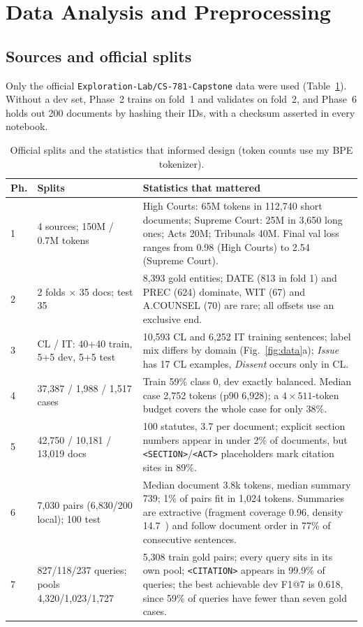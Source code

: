 \documentclass[11pt, oneside]{article}
\begin{document}
\section{Data Analysis and Preprocessing}
\subsection{Sources and official splits}
Only the official \texttt{Exploration-Lab/CS-781-Capstone} data were used (Table~\ref{tab:data}). Without a dev set, Phase~2 trains on fold~1 and validates on fold~2, and Phase~6 holds out 200 documents by hashing their IDs, with a checksum asserted in every notebook.

\begin{table}[t]
\centering
\footnotesize
\caption{Official splits and the statistics that informed design (token counts use my BPE tokenizer).}
\label{tab:data}
\begin{tabular}{p{0.5cm}p{3.6cm}p{10.3cm}}
\toprule
Ph. & Splits & Statistics that mattered \\
\midrule
1 & 4 sources; 150M / 0.7M tokens & High Courts: 65M tokens in 112,740 short documents; Supreme Court: 25M in 3,650 long ones; Acts 20M; Tribunals 40M. Final val loss ranges from 0.98 (High Courts) to 2.54 (Supreme Court). \\
2 & 2 folds $\times$ 35 docs; test 35 & 8,393 gold entities; DATE (813 in fold 1) and PREC (624) dominate, WIT (67) and A.COUNSEL (70) are rare; all offsets use an exclusive end. \\
3 & CL / IT: 40+40 train, 5+5 dev, 5+5 test & 10,593 CL and 6,252 IT training sentences; label mix differs by domain (Fig.~\ref{fig:data}a); \emph{Issue} has 17 CL examples, \emph{Dissent} occurs only in CL. \\
4 & 37,387 / 1,988 / 1,517 cases & Train 59\% class 0, dev exactly balanced. Median case 2,752 tokens (p90 6,928); a $4\times511$-token budget covers the whole case for only 38\%. \\
5 & 42,750 / 10,181 / 13,019 docs & 100 statutes, 3.7 per document; explicit section numbers appear in under 2\% of documents, but \texttt{<SECTION>}/\texttt{<ACT>} placeholders mark citation sites in 89\%. \\
6 & 7,030 pairs (6,830/200 local); 100 test & Median document 3.8k tokens, median summary 739; 1\% of pairs fit in 1,024 tokens. Summaries are extractive (fragment coverage 0.96, density 14.7~\cite{grusky2018newsroom}) and follow document order in 77\% of consecutive sentences. \\
7 & 827/118/237 queries; pools 4,320/1,023/1,727 & 5,308 train gold pairs; every query sits in its own pool; \texttt{<CITATION>} appears in 99.9\% of queries; the best achievable dev F1@7 is 0.618, since 59\% of queries have fewer than seven gold cases. \\
\bottomrule
\end{tabular}
\end{table}
\end{document}
